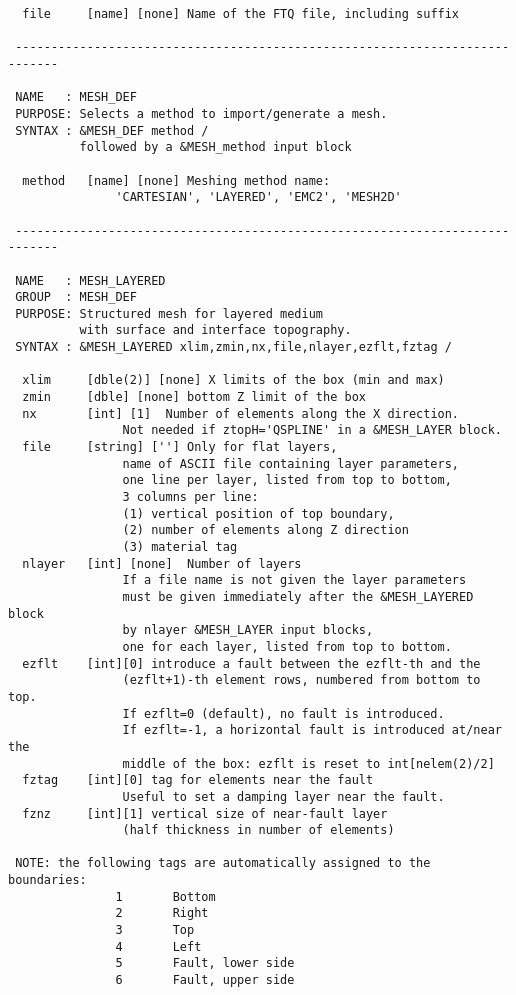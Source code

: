 \begin{verbatim}
  file     [name] [none] Name of the FTQ file, including suffix

 ----------------------------------------------------------------------------

 NAME   : MESH_DEF
 PURPOSE: Selects a method to import/generate a mesh.
 SYNTAX : &MESH_DEF method /
          followed by a &MESH_method input block

  method   [name] [none] Meshing method name:
               'CARTESIAN', 'LAYERED', 'EMC2', 'MESH2D'
               
 ----------------------------------------------------------------------------

 NAME   : MESH_LAYERED
 GROUP  : MESH_DEF
 PURPOSE: Structured mesh for layered medium 
          with surface and interface topography. 
 SYNTAX : &MESH_LAYERED xlim,zmin,nx,file,nlayer,ezflt,fztag /

  xlim     [dble(2)] [none] X limits of the box (min and max)
  zmin     [dble] [none] bottom Z limit of the box 
  nx       [int] [1]  Number of elements along the X direction.
                Not needed if ztopH='QSPLINE' in a &MESH_LAYER block.
  file     [string] [''] Only for flat layers,
                name of ASCII file containing layer parameters, 
                one line per layer, listed from top to bottom, 
                3 columns per line:
                (1) vertical position of top boundary,
                (2) number of elements along Z direction
                (3) material tag
  nlayer   [int] [none]  Number of layers
                If a file name is not given the layer parameters
                must be given immediately after the &MESH_LAYERED block
                by nlayer &MESH_LAYER input blocks,
                one for each layer, listed from top to bottom.
  ezflt    [int][0] introduce a fault between the ezflt-th and the
                (ezflt+1)-th element rows, numbered from bottom to top. 
                If ezflt=0 (default), no fault is introduced.
                If ezflt=-1, a horizontal fault is introduced at/near the 
                middle of the box: ezflt is reset to int[nelem(2)/2]
  fztag    [int][0] tag for elements near the fault
                Useful to set a damping layer near the fault.
  fznz     [int][1] vertical size of near-fault layer
                (half thickness in number of elements) 

 NOTE: the following tags are automatically assigned to the boundaries: 
               1       Bottom 
               2       Right        
               3       Top  
               4       Left
               5       Fault, lower side
               6       Fault, upper side


\end{verbatim}
